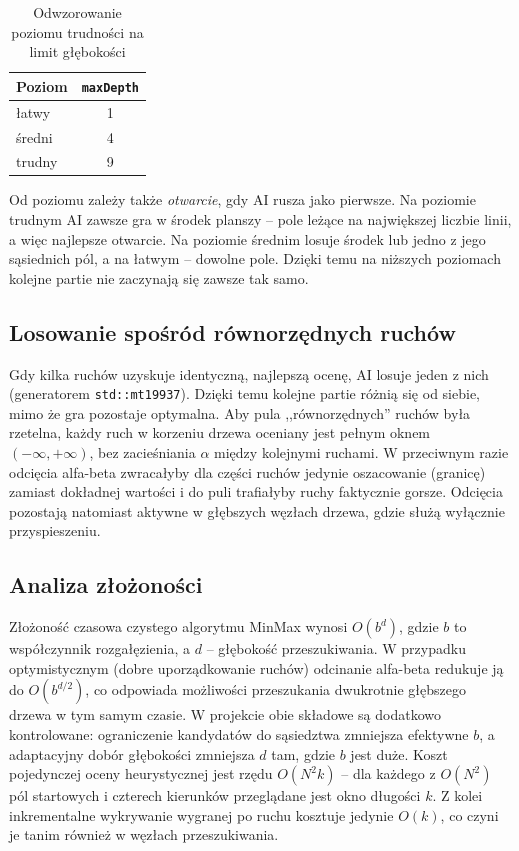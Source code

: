 \begin{table}[H]
\centering
\caption{Odwzorowanie poziomu trudności na limit głębokości}
\begin{tabular}{@{}lc@{}}
\toprule
\textbf{Poziom} & \textbf{\texttt{maxDepth}}\\
\midrule
łatwy   & 1\\
średni  & 4\\
trudny  & 9\\
\bottomrule
\end{tabular}
\end{table}

Od poziomu zależy także \emph{otwarcie}, gdy AI rusza jako pierwsze. Na poziomie trudnym AI zawsze
gra w środek planszy -- pole leżące na największej liczbie linii, a więc najlepsze otwarcie. Na
poziomie średnim losuje środek lub jedno z jego sąsiednich pól, a na łatwym -- dowolne pole. Dzięki
temu na niższych poziomach kolejne partie nie zaczynają się zawsze tak samo.

\subsection{Losowanie spośród równorzędnych ruchów}

Gdy kilka ruchów uzyskuje identyczną, najlepszą ocenę, AI losuje jeden z nich (generatorem
\texttt{std::mt19937}). Dzięki temu kolejne partie różnią się od siebie, mimo że gra pozostaje
optymalna. Aby pula ,,równorzędnych'' ruchów była rzetelna, każdy ruch w korzeniu drzewa oceniany
jest pełnym oknem $(-\infty, +\infty)$, bez zacieśniania $\alpha$ między kolejnymi ruchami.
W przeciwnym razie odcięcia alfa-beta zwracałyby dla części ruchów jedynie oszacowanie (granicę)
zamiast dokładnej wartości i do puli trafiałyby ruchy faktycznie gorsze. Odcięcia pozostają
natomiast aktywne w głębszych węzłach drzewa, gdzie służą wyłącznie przyspieszeniu.

\subsection{Analiza złożoności}

Złożoność czasowa czystego algorytmu MinMax wynosi $O(b^{d})$, gdzie $b$ to współczynnik
rozgałęzienia, a $d$ -- głębokość przeszukiwania. W przypadku optymistycznym (dobre uporządkowanie
ruchów) odcinanie alfa-beta redukuje ją do $O(b^{d/2})$, co odpowiada możliwości przeszukania
dwukrotnie głębszego drzewa w tym samym czasie. W projekcie obie składowe są dodatkowo kontrolowane:
ograniczenie kandydatów do sąsiedztwa zmniejsza efektywne $b$, a adaptacyjny dobór głębokości
zmniejsza $d$ tam, gdzie $b$ jest duże. Koszt pojedynczej oceny heurystycznej jest rzędu
$O(N^{2}k)$ -- dla każdego z $O(N^{2})$ pól startowych i czterech kierunków przeglądane jest okno
długości $k$. Z kolei inkrementalne wykrywanie wygranej po ruchu kosztuje jedynie $O(k)$, co czyni
je tanim również w węzłach przeszukiwania.


